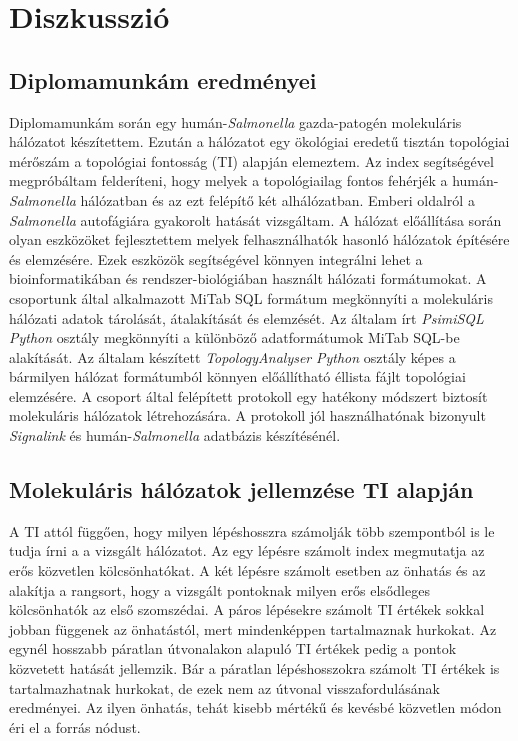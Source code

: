 \documentclass[a4paper,12pt]{article}
\begin{document}
		\pagebreak
	
\section{Diszkusszió}
		\subsection{Diplomamunkám eredményei}		
		Diplomamunkám során egy humán-\textit{Salmonella} gazda-patogén molekuláris hálózatot készítettem. Ezután a hálózatot egy ökológiai eredetű tisztán topológiai mérőszám a topológiai fontosság (TI) alapján elemeztem. Az index segítségével megpróbáltam felderíteni, hogy melyek a topológiailag fontos fehérjék a humán-\textit{Salmonella} hálózatban és az ezt felépítő két alhálózatban. Emberi oldalról a \textit{Salmonella} autofágiára gyakorolt hatását vizsgáltam. A hálózat előállítása során olyan eszközöket fejlesztettem melyek felhasználhatók hasonló hálózatok építésére és elemzésére. Ezek eszközök segítségével könnyen integrálni lehet a bioinformatikában és rendszer-biológiában használt hálózati formátumokat. A csoportunk által alkalmazott MiTab SQL formátum megkönnyíti a molekuláris hálózati adatok tárolását, átalakítását és elemzését. Az általam írt \textit{PsimiSQL} \textit{Python} osztály megkönnyíti a különböző adatformátumok MiTab SQL-be alakítását. Az általam készített \textit{TopologyAnalyser} \textit{Python} osztály képes a  bármilyen hálózat formátumból könnyen előállítható éllista fájlt topológiai elemzésére.  A csoport által felépített protokoll egy hatékony módszert biztosít molekuláris hálózatok létrehozására. A protokoll jól használhatónak bizonyult \textit{Signalink} és humán-\textit{Salmonella} adatbázis készítésénél.
		
		\subsection{Molekuláris hálózatok jellemzése TI alapján}
		A TI attól függően, hogy milyen lépéshosszra számolják több szempontból is le tudja írni a a vizsgált hálózatot. Az egy lépésre számolt index megmutatja az erős közvetlen kölcsönhatókat. A két lépésre számolt esetben az önhatás és az alakítja a rangsort, hogy a vizsgált pontoknak milyen erős elsődleges kölcsönhatók az első szomszédai. A páros lépésekre számolt TI értékek sokkal jobban függenek az önhatástól, mert mindenképpen tartalmaznak hurkokat. Az egynél hosszabb páratlan útvonalakon alapuló TI értékek pedig a pontok közvetett hatását jellemzik. Bár a páratlan lépéshosszokra számolt TI értékek is tartalmazhatnak hurkokat, de ezek nem az útvonal visszafordulásának eredményei. Az ilyen önhatás, tehát kisebb mértékű és kevésbé közvetlen módon éri el a forrás nódust.
		
\end{document}
